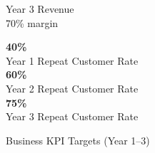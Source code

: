 \begin{figure}[H]
\begin{minipage}[t]{0.32\textwidth}
\begin{tcolorbox}[colback=BoxGreen,colframe=AccentGreen,arc=5pt,boxrule=1pt,
            halign=center,top=6pt,bottom=6pt]
            {\footnotesize\color{DarkGrey}Year 3 Revenue\\70\% margin}
        \end{tcolorbox}
    \end{minipage}\hfill
    \begin{minipage}[t]{0.32\textwidth}
        \begin{tcolorbox}[colback=BoxOrange,colframe=AccentOrange,arc=5pt,boxrule=1pt,
            halign=center,top=6pt,bottom=6pt]
            {\large\bfseries\color{AccentOrange}40\%}\\
            {\footnotesize\color{DarkGrey}Year 1 Repeat Customer Rate}\\[4pt]
            {\large\bfseries\color{SecondaryBlue}60\%}\\
            {\footnotesize\color{DarkGrey}Year 2 Repeat Customer Rate}\\[4pt]
            {\large\bfseries\color{AccentGreen}75\%}\\
            {\footnotesize\color{DarkGrey}Year 3 Repeat Customer Rate}
        \end{tcolorbox}
    \end{minipage}
    \caption{Business KPI Targets (Year 1--3)}
    \label{tab:business_kpis}
\end{figure}

